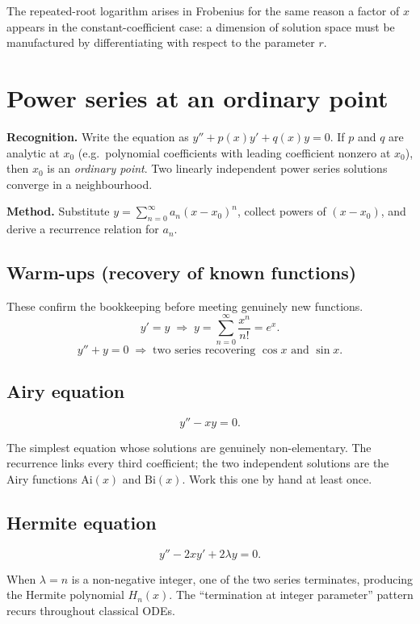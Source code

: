\documentclass{essay}
\begin{document}
The repeated-root logarithm arises in Frobenius for the same reason a factor of $x$ appears in the constant-coefficient case: a dimension of solution space must be manufactured by differentiating with respect to the parameter $r$.

\section{Power series at an ordinary point}

\textbf{Recognition.}  Write the equation as $y'' + p(x)y' + q(x)y = 0$.  If $p$ and $q$ are analytic at $x_0$ (e.g.\ polynomial coefficients with leading coefficient nonzero at $x_0$), then $x_0$ is an \emph{ordinary point}.  Two linearly independent power series solutions converge in a neighbourhood.

\textbf{Method.}  Substitute $y = \sum_{n=0}^{\infty} a_n (x - x_0)^n$, collect powers of $(x-x_0)$, and derive a recurrence relation for $a_n$.

\subsection*{Warm-ups (recovery of known functions)}

These confirm the bookkeeping before meeting genuinely new functions.
\[
  y' = y \;\Rightarrow\; y = \sum_{n=0}^{\infty} \frac{x^n}{n!} = e^x.
\]
\[
  y'' + y = 0 \;\Rightarrow\; \text{two series recovering } \cos x \text{ and } \sin x.
\]

\subsection*{Airy equation}

\[
  y'' - xy = 0.
\]

The simplest equation whose solutions are genuinely non-elementary.  The recurrence links every third coefficient; the two independent solutions are the Airy functions $\mathrm{Ai}(x)$ and $\mathrm{Bi}(x)$.  Work this one by hand at least once.

\subsection*{Hermite equation}

\[
  y'' - 2xy' + 2\lambda y = 0.
\]

When $\lambda = n$ is a non-negative integer, one of the two series terminates, producing the Hermite polynomial $H_n(x)$.  The ``termination at integer parameter'' pattern recurs throughout classical ODEs.
\end{document}

